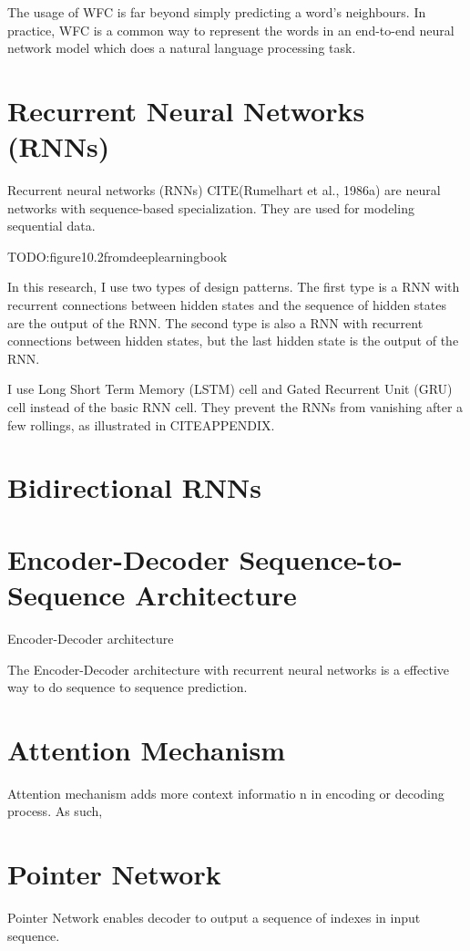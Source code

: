\documentclass[modernstyle,12pt]{sjsuthesis}
\theoremstyle{definition}
\begin{document}
The usage of WFC is far beyond simply predicting a word's neighbours. In practice, WFC is a common way to represent the words in an end-to-end neural network model which does a natural language processing task.
\section{Recurrent Neural Networks (RNNs)}
Recurrent neural networks (RNNs) CITE(Rumelhart et al., 1986a) are neural networks with sequence-based specialization. They are used for modeling sequential data.

TODO:figure10.2fromdeeplearningbook

In this research, I use two types of design patterns. The first type is a RNN with recurrent connections between hidden states and the sequence of hidden states are the output of the RNN. The second type is also a RNN with recurrent connections between hidden states, but the last hidden state is the output of the RNN.

I use Long Short Term Memory (LSTM) cell and Gated Recurrent Unit (GRU) cell instead of the basic RNN cell. They prevent the RNNs from vanishing after a few rollings, as illustrated in CITEAPPENDIX.
\section{Bidirectional RNNs}
\section{Encoder-Decoder Sequence-to-Sequence Architecture}

Encoder-Decoder architecture

The Encoder-Decoder architecture with recurrent neural networks is a effective way to do sequence to sequence prediction.

\section{Attention Mechanism}

Attention mechanism adds more context informatio n in encoding or decoding process. As such,




\section{Pointer Network}

Pointer Network enables decoder to output a sequence of indexes in input sequence.
\end{document}
